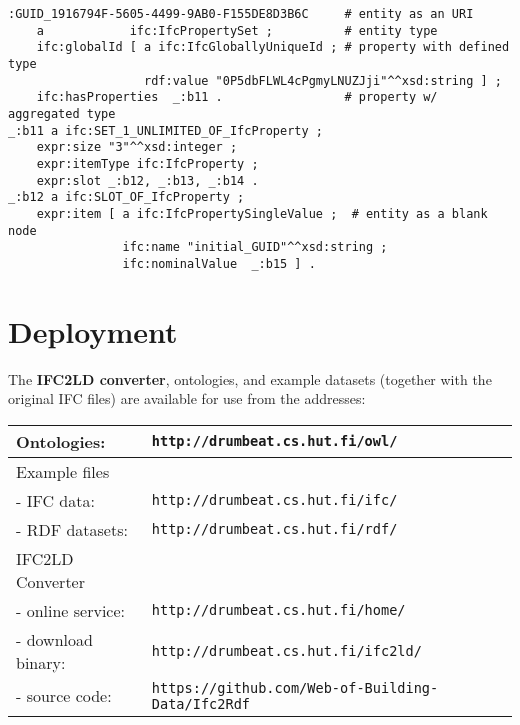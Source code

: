 \begin{lstlisting}
:GUID_1916794F-5605-4499-9AB0-F155DE8D3B6C     # entity as an URI
    a            ifc:IfcPropertySet ;          # entity type
    ifc:globalId [ a ifc:IfcGloballyUniqueId ; # property with defined type
                   rdf:value "0P5dbFLWL4cPgmyLNUZJji"^^xsd:string ] ;
    ifc:hasProperties  _:b11 .                 # property w/ aggregated type
_:b11 a ifc:SET_1_UNLIMITED_OF_IfcProperty ;
    expr:size "3"^^xsd:integer ;
    expr:itemType ifc:IfcProperty ;
    expr:slot _:b12, _:b13, _:b14 .
_:b12 a ifc:SLOT_OF_IfcProperty ;
    expr:item [ a ifc:IfcPropertySingleValue ;  # entity as a blank node
                ifc:name "initial_GUID"^^xsd:string ;
                ifc:nominalValue  _:b15 ] .
\end{lstlisting}



\section{Deployment}

The \textbf{IFC2LD converter}, \ifcowl{} ontologies, and example \ifcrdf{} datasets (together with the original IFC files) are available for use from the addresses:

\noindent
\begin{scriptsize}
\begin{center}
    \def\arraystretch{1.2}
    \setlength{\tabcolsep}{6pt}
    \begin{tabularx}{0.90\textwidth}{|l|X|}
        \hline
        Ontologies: & \texttt{http://drumbeat.cs.hut.fi/owl/} \\
        \hline
        Example files & \\
        - IFC data: & \texttt{http://drumbeat.cs.hut.fi/ifc/} \\
        - RDF datasets: & \texttt{http://drumbeat.cs.hut.fi/rdf/} \\
        \hline
        IFC2LD Converter & \\
        - online service: & \texttt{http://drumbeat.cs.hut.fi/home/} \\
        - download binary: & \texttt{http://drumbeat.cs.hut.fi/ifc2ld/} \\
        - source code: & \texttt{https://github.com/Web-of-Building-Data/Ifc2Rdf} \\
        \hline
    \end{tabularx}
\end{center}
\end{scriptsize}




